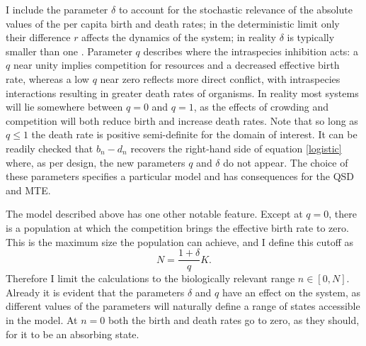 I include the parameter $\delta$ to account for the stochastic relevance of the absolute values of the per capita birth and death rates; in the deterministic limit only their difference $r$ affects the dynamics of the system; in reality $\delta$ is typically smaller than one \cite{Servais1985}. 
Parameter $q$ describes where the intraspecies inhibition acts: a $q$ near unity implies competition for resources and a decreased effective birth rate, whereas a low $q$ near zero reflects more direct conflict, with intraspecies interactions resulting in greater death rates of organisms. 
In reality most systems will lie somewhere between $q=0$ and $q=1$, as the effects of crowding and competition will both reduce birth and increase death rates. 
Note that so long as $q\leq 1$ the death rate is positive semi-definite for the domain of interest. 
It can be readily checked that $b_n-d_n$ recovers the right-hand side of equation \ref{logistic} where, as per design, the new parameters $q$ and $\delta$ do not appear.
The choice of these parameters specifies a particular model and has consequences for the QSD and MTE. 

The model described above has one other notable feature. 
Except at $q=0$, there is a population at which the competition brings the effective birth rate to zero. 
This is the maximum size the population can achieve, and I define this cutoff as
\begin{equation}
N = \frac{1+\delta}{q}K. 
\label{maxN}
\end{equation}
Therefore I limit the calculations to the biologically relevant range $n\in[0,N]$. %
Already it is evident that the parameters $\delta$ and $q$ have an effect on the system, as different values of the parameters will naturally define a range of states accessible in the model. 
At $n=0$ both the birth and death rates go to zero, as they should, for it to be an absorbing state. %



